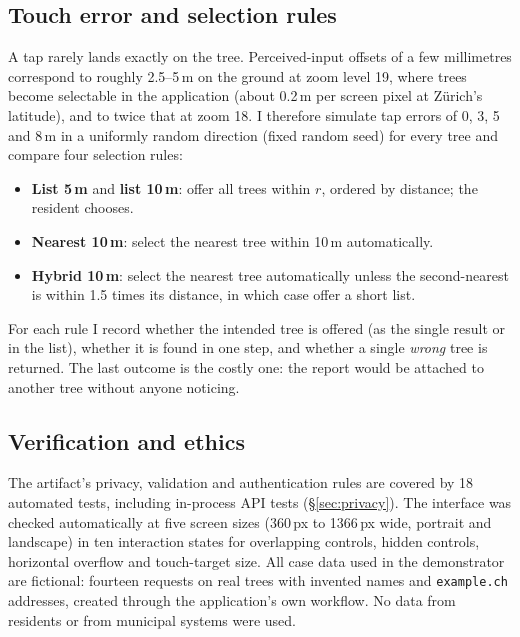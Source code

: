 \documentclass[11pt,a4paper]{article}
\begin{document}
\subsection{Touch error and selection rules}

A tap rarely lands exactly on the tree. Perceived-input offsets of a few millimetres \cite{holz2010,parhi2006} correspond to roughly 2.5--5\,m on the ground at zoom level 19, where trees become selectable in the application (about 0.2\,m per screen pixel at Zürich's latitude), and to twice that at zoom 18. I therefore simulate tap errors of 0, 3, 5 and 8\,m in a uniformly random direction (fixed random seed) for every tree and compare four selection rules:

\begin{itemize}
  \item \textbf{List 5\,m} and \textbf{list 10\,m}: offer all trees within $r$, ordered by distance; the resident chooses.
  \item \textbf{Nearest 10\,m}: select the nearest tree within 10\,m automatically.
  \item \textbf{Hybrid 10\,m}: select the nearest tree automatically unless the second-nearest is within 1.5 times its distance, in which case offer a short list.
\end{itemize}

For each rule I record whether the intended tree is offered (as the single result or in the list), whether it is found in one step, and whether a single \emph{wrong} tree is returned. The last outcome is the costly one: the report would be attached to another tree without anyone noticing.

\subsection{Verification and ethics}

The artifact's privacy, validation and authentication rules are covered by 18 automated tests, including in-process API tests (\S\ref{sec:privacy}). The interface was checked automatically at five screen sizes (360\,px to 1366\,px wide, portrait and landscape) in ten interaction states for overlapping controls, hidden controls, horizontal overflow and touch-target size. All case data used in the demonstrator are fictional: fourteen requests on real trees with invented names and \texttt{example.ch} addresses, created through the application's own workflow. No data from residents or from municipal systems were used.
\end{document}
